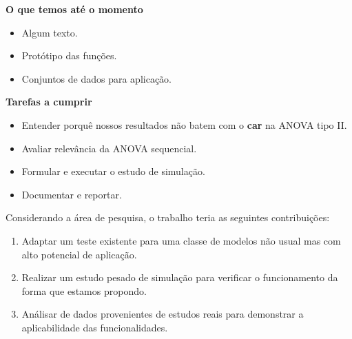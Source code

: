 \documentclass[10pt,
  aspectratio=169,
  serif,
  mathserif,
  professionalfont,
  compress,
  handout,
  ]{beamer}\usepackage[]{graphicx}\usepackage[]{color}
\begin{document}
\begin{frame}[c, allowframebreaks]

\textbf{O que temos até o momento}

\begin{itemize}
  
  \item Algum texto.	

	\item Protótipo das funções.
	
	\item Conjuntos de dados para aplicação.
   
\end{itemize}

\textbf{Tarefas a cumprir}

\begin{itemize}
  
  \item Entender porquê nossos resultados não batem com o \textbf{car} na ANOVA tipo II.
  
  \item Avaliar relevância da ANOVA sequencial.
  
  \item Formular e executar o estudo de simulação.
  
  \item Documentar e reportar.

\end{itemize}

\end{frame}


\begin{frame}[c, allowframebreaks]

Considerando a área de pesquisa, o trabalho teria as seguintes contribuições:

\begin{enumerate}
  \item Adaptar um teste existente para uma classe de modelos não usual mas com alto potencial de aplicação.
  \item Realizar um estudo pesado de simulação para verificar o funcionamento da forma que estamos propondo.
  \item Análisar de dados provenientes de estudos reais para demonstrar a aplicabilidade das funcionalidades.
\end{enumerate}

\end{frame}
\end{document}
